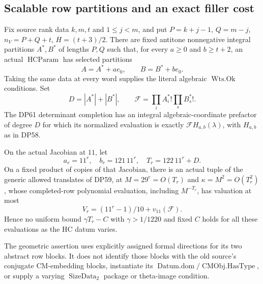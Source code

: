 \subsection{Scalable row partitions and an exact filler cost}

\begin{proposition}\label{DP63}
Fix source rank data $k,m,t$ and $1\le j<m$, and put
$P=k+j-1$, $Q=m-j$, $n_V=P+Q+t$, $H=(t+3)/2$.
There are fixed antitone nonnegative integral partitions $A^*,B^*$ of
lengths $P,Q$ such that, for every $a\ge0$ and $b\ge t+2$, an actual
$\operatorname{HCParam}$ has selected partitions
\[
 A=A^*+ae_0,\qquad B=B^*+be_0.
\]
Taking the same data at every word supplies the literal algebraic
$\operatorname{Wts.Ok}$ conditions. Set
\[
 D=|A^*|+|B^*|,\qquad
 \mathcal F=\prod_i A_i^*!\prod_s B_s^*!.
\]
The DP61 determinant completion has an integral algebraic-coordinate
prefactor of degree $D$ for which its normalized evaluation is exactly
$\mathcal F H_{a,b}(\lambda)$, with $H_{a,b}$ as in DP58.

On the actual Jacobian at $11$, let
\[
 a_r=11^r,\quad b_r=121\,11^r,\quad T_r=122\,11^r+D.
\]
On a fixed product of copies of that Jacobian, there is an actual tuple
of the generic allowed translates of DP59, at
$M=29^e=O(T_r)$ and $\kappa=M^2=O(T_r^2)$, whose completed-row
polynomial evaluation, including $M^{-T_r}$, has valuation at most
\[
 V_r=(11^r-1)/10+v_{11}(\mathcal F).
\]
Hence no uniform bound $\gamma T_r-C$ with $\gamma>1/1220$ and fixed
$C$ holds for all these evaluations as the HC datum varies.

The geometric assertion uses explicitly assigned formal directions for
its two abstract row blocks. It does not identify those blocks with the
old source's conjugate CM-embedding blocks, instantiate its
$\operatorname{Datum.dom}/\operatorname{CMObj.HasType}$, or supply a
varying $\operatorname{SizeData}_2$ package or theta-image condition.
\end{proposition}

